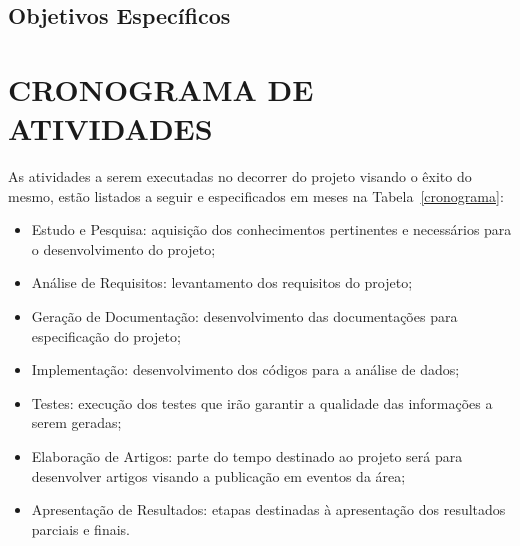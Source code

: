 \subsection{Objetivos Específicos}\label{subsec:objetivos_especificos}
%

\section{CRONOGRAMA DE ATIVIDADES}\label{subsec:cronograma}

As atividades a serem executadas no decorrer do projeto visando o êxito do mesmo, estão listados a seguir e especificados em meses na Tabela~\ref{cronograma}:

\begin{itemize}
  \item Estudo e Pesquisa: aquisição dos conhecimentos pertinentes e necessários para o desenvolvimento do projeto;
  \item Análise de Requisitos: levantamento dos requisitos do projeto;
  \item Geração de Documentação: desenvolvimento das documentações para especificação do projeto;
  \item Implementação: desenvolvimento dos códigos para a análise de dados;
  \item Testes: execução dos testes que irão garantir a qualidade das informações a serem geradas;
  \item Elaboração de Artigos: parte do tempo destinado ao projeto será para desenvolver artigos visando a publicação em eventos da área;
  \item Apresentação de Resultados: etapas destinadas à apresentação dos resultados parciais e finais.
\end{itemize}


